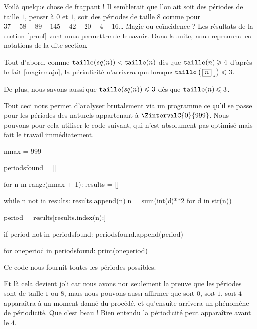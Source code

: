 \medskip

Voilà quelque chose de frappant ! Il semblerait que l'on ait soit des périodes de taille $1$, penser à $0$ et $1$, soit des périodes de taille $8$ comme pour $37 - 58 - 89 - 145 - 42 - 20 - 4 - 16$\dots{}
Magie ou coïncidence ? Les résultats de la section \ref{proof} vont nous permettre de le savoir. Dans la suite, nous reprenons les notations de la dite section.


\medskip

Tout d'abord, comme $\operatorname{\text{\normalfont\texttt{taille}}}(sq(n)) < \operatorname{\text{\normalfont\texttt{taille}}}(n)$ dès que $\operatorname{\text{\normalfont\texttt{taille}}}(n) \geqslant 4$ d'après le fait \ref{magicmajo}, la périodicité n'arrivera que lorsque $\operatorname{\text{\normalfont\texttt{taille}}}\left( \, \fbox{$n$}_{\,\,k} \right) \leqslant 3$.


\medskip

De plus, nous savons aussi que $\operatorname{\text{\normalfont\texttt{taille}}}(sq(n)) \leqslant 3$ dès que $\operatorname{\text{\normalfont\texttt{taille}}}(n) \leqslant 3$.


\medskip

Tout ceci nous permet d'analyser brutalement via un programme ce qu'il se passe pour les périodes des naturels appartenant à $\ZintervalC{0}{999}$. Nous pouvons pour cela utiliser le code suivant, qui n'est absolument pas optimisé mais fait le travail immédiatement.

\begin{rawcode}
nmax = 999

periodsfound = []

for n in range(nmax + 1):
    results = []

    while n not in results:
        results.append(n)
        n = sum(int(d)**2 for d in str(n))

    period = results[results.index(n):]

    if period not in periodsfound:
        periodsfound.append(period)

for oneperiod in periodsfound:
    print(oneperiod)
\end{rawcode}


\medskip

Ce code nous fournit toutes les périodes possibles.

\begin{rawcode}
[0]
[1]
[4, 16, 37, 58, 89, 145, 42, 20]
[37, 58, 89, 145, 42, 20, 4, 16]
[89, 145, 42, 20, 4, 16, 37, 58]
[16, 37, 58, 89, 145, 42, 20, 4]
[20, 4, 16, 37, 58, 89, 145, 42]
[58, 89, 145, 42, 20, 4, 16, 37]
[42, 20, 4, 16, 37, 58, 89, 145]
[145, 42, 20, 4, 16, 37, 58, 89]
\end{rawcode}


\medskip

Et là cela devient joli car nous avons non seulement la preuve que les périodes sont de taille $1$ ou $8$, mais nous pouvons aussi affirmer que soit $0$, soit $1$, soit $4$ apparaîtra à un moment donné du procédé, et qu'ensuite arrivera un phénomène de périodicité. Que c'est beau !
Bien entendu la périodicité peut apparaître avant le $4$.
